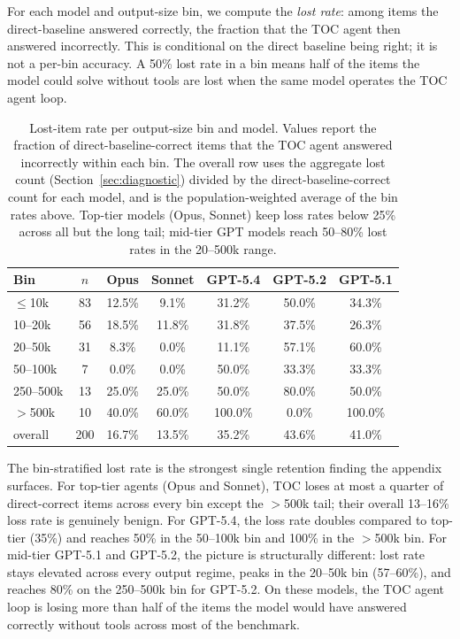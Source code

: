 \documentclass{article}
\begin{document}
For each model and output-size bin, we compute the \emph{lost rate}: among items the direct-baseline answered correctly, the fraction that the TOC agent then answered incorrectly. This is conditional on the direct baseline being right; it is not a per-bin accuracy. A 50\% lost rate in a bin means half of the items the model could solve without tools are lost when the same model operates the TOC agent loop.

\begin{table}[h]
\centering
\small
\setlength{\tabcolsep}{6pt}
\caption{Lost-item rate per output-size bin and model. Values report the fraction of direct-baseline-correct items that the TOC agent answered incorrectly within each bin. The overall row uses the aggregate lost count (Section~\ref{sec:diagnostic}) divided by the direct-baseline-correct count for each model, and is the population-weighted average of the bin rates above. Top-tier models (Opus, Sonnet) keep loss rates below 25\% across all but the long tail; mid-tier GPT models reach 50--80\% lost rates in the 20--500k range.}
\label{tab:appendix-retention-by-bin}
\begin{tabular}{lcccccc}
\toprule
Bin & $n$ & Opus & Sonnet & GPT-5.4 & GPT-5.2 & GPT-5.1 \\
\midrule
$\le$10k & 83 & 12.5\% & 9.1\% & 31.2\% & 50.0\% & 34.3\% \\
10--20k & 56 & 18.5\% & 11.8\% & 31.8\% & 37.5\% & 26.3\% \\
20--50k & 31 & 8.3\% & 0.0\% & 11.1\% & 57.1\% & 60.0\% \\
50--100k & 7 & 0.0\% & 0.0\% & 50.0\% & 33.3\% & 33.3\% \\
250--500k & 13 & 25.0\% & 25.0\% & 50.0\% & 80.0\% & 50.0\% \\
$>$500k & 10 & 40.0\% & 60.0\% & 100.0\% & 0.0\% & 100.0\% \\
\midrule
overall & 200 & 16.7\% & 13.5\% & 35.2\% & 43.6\% & 41.0\% \\
\bottomrule
\end{tabular}
\end{table}

The bin-stratified lost rate is the strongest single retention finding the appendix surfaces. For top-tier agents (Opus and Sonnet), TOC loses at most a quarter of direct-correct items across every bin except the $>$500k tail; their overall 13--16\% loss rate is genuinely benign. For GPT-5.4, the loss rate doubles compared to top-tier (35\%) and reaches 50\% in the 50--100k bin and 100\% in the $>$500k bin. For mid-tier GPT-5.1 and GPT-5.2, the picture is structurally different: lost rate stays elevated across every output regime, peaks in the 20--50k bin (57--60\%), and reaches 80\% on the 250--500k bin for GPT-5.2. On these models, the TOC agent loop is losing more than half of the items the model would have answered correctly without tools across most of the benchmark.
\end{document}
